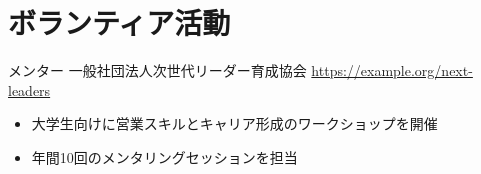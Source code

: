 \documentclass[a4paper, serif, 10pt]{moderncv}
\begin{document}
\section{ボランティア活動}

        {メンター}
        {一般社団法人次世代リーダー育成協会}
        {\url{https://example.org/next-leaders}}
        {}
        {\begin{itemize}
\item 大学生向けに営業スキルとキャリア形成のワークショップを開催
\item 年間10回のメンタリングセッションを担当
\end{itemize}}
    
\end{document}
